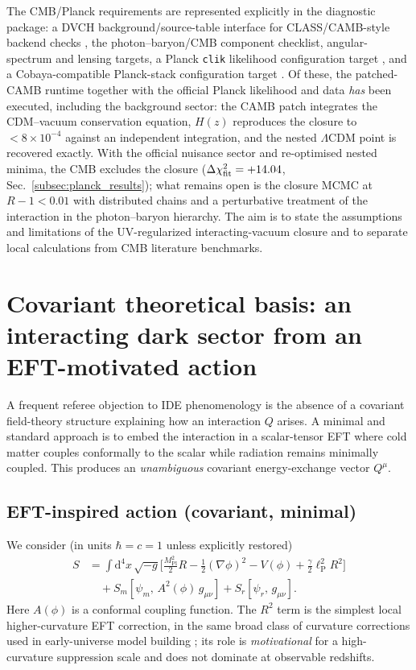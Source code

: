 \documentclass[pdflatex,sn-mathphys-num]{sn-jnl}%
\newcommand{\mpl}{M_{\mathrm{Pl}}}
\newcommand{\lpl}{\ell_{\mathrm{P}}}
\newcommand{\dd}{\mathrm{d}}
\begin{document}
The CMB/Planck requirements are represented explicitly in the diagnostic
package: a DVCH background/source-table interface for CLASS/CAMB-style backend checks \cite{Blas:2011rf,Lewis:1999bs}, the photon--baryon/CMB
component checklist, angular-spectrum and lensing targets, a Planck
\texttt{clik} likelihood configuration target \cite{Planck:2019nip}, and a
Cobaya-compatible Planck-stack configuration target
\cite{Torrado:2020dgo}. Of these, the patched-CAMB runtime together with the official Planck likelihood and data \emph{has} been executed, including the background sector: the CAMB patch integrates the CDM--vacuum conservation equation, $H(z)$ reproduces the closure to $<8\times10^{-4}$ against an independent integration, and the nested $\Lambda$CDM point is recovered exactly. With the official nuisance sector and re-optimised nested minima, the CMB excludes the closure ($\Delta\chi^2_{\rm fit}=+14.04$, Sec.~\ref{subsec:planck_results}); what remains open is the closure MCMC at $R-1<0.01$ with distributed chains and a perturbative treatment of the interaction in the photon--baryon hierarchy. The aim is to state the assumptions and limitations of the UV-regularized interacting-vacuum closure and to separate local calculations from CMB literature benchmarks.

\section{Covariant theoretical basis: an interacting dark sector from an EFT-motivated action}
\label{sec:action}

A frequent referee objection to IDE phenomenology is the absence of a
covariant field-theory structure explaining how an interaction $Q$ arises.
A minimal and standard approach is to embed the interaction in a scalar-tensor
EFT where cold matter couples conformally to the scalar while radiation
remains minimally coupled. This produces an \emph{unambiguous} covariant
energy-exchange vector $Q^\mu$.

\subsection{EFT-inspired action (covariant, minimal)}
\label{subsec:action_min}

We consider (in units $\hbar=c=1$ unless explicitly restored)
\begin{equation*}
\begin{aligned}
S &= \int \dd^4x\,\sqrt{-g}\Bigg[
\frac{\mpl^2}{2} R
-\frac{1}{2}(\nabla\phi)^2 - V(\phi)
+ \frac{\gamma}{2}\lpl^2 R^2
\Bigg]\\
&\quad + S_m\!\left[\psi_m,\,A^2(\phi)\,g_{\mu\nu}\right]
+ S_r\!\left[\psi_r,\,g_{\mu\nu}\right].
\end{aligned}
\end{equation*}
Here $A(\phi)$ is a conformal coupling function. The $R^2$ term is the simplest
local higher-curvature EFT correction, in the same broad class of curvature corrections used in early-universe model building \cite{Starobinsky:1980te}; its role is \emph{motivational} for a
high-curvature suppression scale and does not dominate at observable redshifts.
\end{document}
